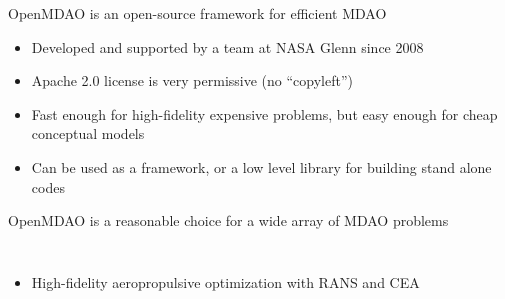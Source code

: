 \documentclass[aspectratio=169, usenames,dvipsnames, 14pt]{beamer}
\begin{document}
\begin{frame}{OpenMDAO is an open-source framework for efficient MDAO}
    \begin{itemize}
        \item Developed and supported by a team at NASA Glenn since 2008
        \vspace{0.5cm}
        \item Apache 2.0 license is very permissive (no “copyleft”)
        \vspace{0.5cm}
        \item Fast enough for high-fidelity expensive problems, but easy enough for cheap conceptual models
        \vspace{0.5cm}
        \item Can be used as a framework, or a low level library for building stand alone codes
    \end{itemize}
    
\end{frame}

\begin{frame}{OpenMDAO is a reasonable choice for a wide array of MDAO problems}
    \begin{columns}
    
            \begin{itemize}
                \item High-fidelity aeropropulsive optimization with RANS and CEA
                
                
            \end{itemize}
        
            
            
    \end{columns}
\end{frame}
\end{document}
